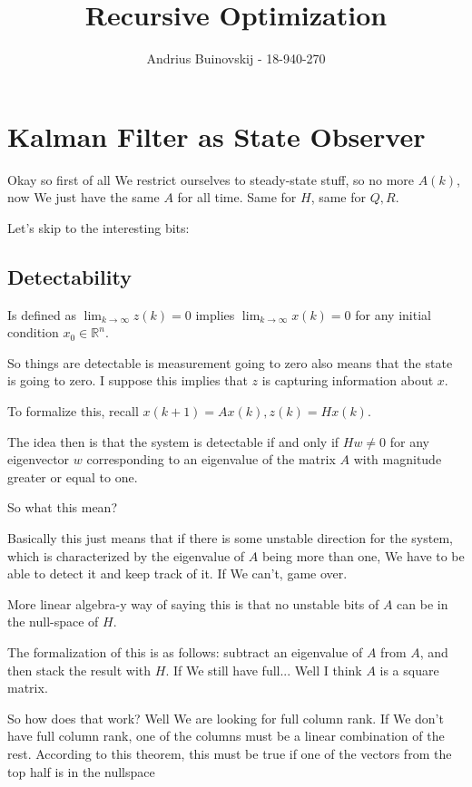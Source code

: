\documentclass{article}
\begin{document}
\title{Recursive Optimization}
\author{Andrius Buinovskij - 18-940-270}
\date{}

\maketitle

\section{Kalman Filter as State Observer}

	Okay so first of all We restrict ourselves to steady-state stuff, so no more $A(k)$, now We just have the same $A$ for all time. Same for $H$, same for $Q, R$.
	
	Let's skip to the interesting bits:
	
	\subsection{Detectability}
	
		Is defined as $\lim_{k\to\infty} z(k) = 0$ implies $\lim_{k\to\infty} x(k)=0$  for any initial condition $x_0\in\mathbb{R}^n$.
		
		So things are detectable is measurement going to zero also means that the state is going to zero. I suppose this implies that $z$ is capturing information about $x$.
		
		To formalize this, recall $x(k+1) = Ax(k), z(k) = Hx(k)$.
		
		The idea then is that the system is detectable if and only if $Hw\neq 0$ for any eigenvector $w$ corresponding to an eigenvalue of the matrix $A$ with magnitude greater or equal to one.
		
		So what this mean?
		
		Basically this just means that if there is some unstable direction for the system, which is characterized by the eigenvalue of $A$ being more  than one, We have to be able to detect it and keep track of it. If We can't, game over.
		
		More linear algebra-y way of saying this is  that no unstable bits of $A$ can be in the null-space of $H$.
		
		The formalization of this is as follows: subtract an eigenvalue of $A$ from $A$, and then stack the result with $H$. If We still have full... Well I think $A$ is a square matrix. 
		
		So how does that work? Well We are looking for full column rank. If We don't have full column rank, one of the columns must be a linear combination of the rest. According to this theorem, this must be true if one of the vectors from the top half is in the nullspace 
		
\end{document}
